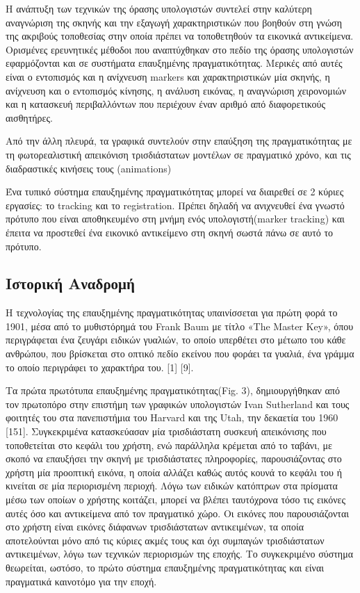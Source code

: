 Η ανάπτυξη των τεχνικών της όρασης υπολογιστών συντελεί στην καλύτερη αναγνώριση της σκηνής και την εξαγωγή χαρακτηριστικών που βοηθούν στη γνώση της ακριβούς τοποθεσίας στην οποία πρέπει να τοποθετηθούν τα εικονικά αντικείμενα. Ορισμένες ερευνητικές μέθοδοι που αναπτύχθηκαν στο πεδίο της όρασης υπολογιστών εφαρμόζονται και σε συστήματα επαυξημένης πραγματικότητας. Μερικές από αυτές είναι ο εντοπισμός και η ανίχνευση markers και χαρακτηριστικών μία σκηνής, η ανίχνευση και ο εντοπισμός κίνησης, η ανάλυση εικόνας, η αναγνώριση χειρονομιών και η κατασκευή περιβαλλόντων που περιέχουν έναν αριθμό από διαφορετικούς αισθητήρες.


Από την άλλη πλευρά, τα γραφικά συντελούν στην επαύξηση της πραγματικότητας με τη φωτορεαλιστική απεικόνιση τρισδιάστατων μοντέλων σε πραγματικό χρόνο, και τις διαδραστικές κινήσεις τους (animations)



Ένα τυπικό σύστημα επαυξημένης πραγματικότητας μπορεί να διαιρεθεί σε 2 κύριες εργασίες: το tracking και το registration.
Πρέπει δηλαδή να ανιχνευθεί ένα γνωστό πρότυπο που είναι αποθηκευμένο στη μνήμη ενός υπολογιστή(marker tracking) \cite{krevelen2010} και έπειτα να προστεθεί ένα εικονικό αντικείμενο στη σκηνή σωστά πάνω σε αυτό το πρότυπο.



\subsection{Ιστορική Αναδρομή}

Η τεχνολογίας της επαυξημένης πραγματικότητας υπαινίσσεται για πρώτη φορά το 1901, μέσα από το μυθιστόρημά του Frank Baum με τίτλο «The Master Key», όπου περιγράφεται ένα ζευγάρι ειδικών γυαλιών, το οποίο υπερθέτει στο μέτωπο του κάθε ανθρώπου, που βρίσκεται στο οπτικό πεδίο εκείνου που φοράει τα γυαλιά, ένα γράμμα το οποίο περιγράφει το χαρακτήρα του. [1] [9].


Τα πρώτα πρωτότυπα επαυξημένης πραγματικότητας(Fig. 3), δημιουργήθηκαν από τον πρωτοπόρο στην επιστήμη των γραφικών υπολογιστών Ivan Sutherland και τους φοιτητές του στα πανεπιστήμια του Harvard και της Utah, την δεκαετία του 1960 [151]. Συγκεκριμένα κατασκεύασαν μία τρισδιάστατη συσκευή απεικόνισης που τοποθετείται στο κεφάλι του χρήστη, ενώ παράλληλα κρέμεται από το ταβάνι, με σκοπό να επαυξήσει την σκηνή με τρισδιάστατες πληροφορίες, παρουσιάζοντας στο χρήστη μία προοπτική εικόνα, η οποία αλλάζει καθώς αυτός κουνά το κεφάλι του ή κινείται σε μία περιορισμένη περιοχή. Λόγω των ειδικών κατόπτρων στα πρίσματα μέσω των οποίων ο χρήστης κοιτάζει, μπορεί να βλέπει ταυτόχρονα τόσο τις εικόνες αυτές όσο και αντικείμενα από τον πραγματικό χώρο. Οι εικόνες που παρουσιάζονται στο χρήστη είναι εικόνες διάφανων τρισδιάστατων αντικειμένων, τα οποία αποτελούνται μόνο από τις κύριες ακμές τους και όχι συμπαγών τρισδιάστατων αντικειμένων, λόγω των τεχνικών περιορισμών της εποχής. Το συγκεκριμένο σύστημα θεωρείται, ωστόσο, το πρώτο σύστημα επαυξημένης πραγματικότητας και είναι πραγματικά καινοτόμο για την εποχή. \cite{sutherland1968head}


